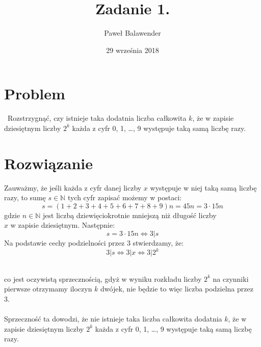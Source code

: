 \documentclass[11pt]{article}
\title{Zadanie 1.}
\date{29 września 2018}
\author{Paweł Balawender}
\begin{document}
\maketitle

\section*{Problem}\
Rozstrzygnąć, czy istnieje taka dodatnia liczba całkowita $k$, że w zapisie dziesiętnym liczby $2^k$ każda z cyfr 0, 1,  \ldots, 9 występuje taką samą liczbę razy.

\section*{Rozwiązanie}
Zauważmy, że jeśli każda z cyfr danej liczby $x$ występuje w niej taką samą liczbę razy, to sumę $s \in\mathbb{N}$ tych cyfr zapisać możemy w postaci:
\begin{equation}
s=(1+2+3+4+5+6+7+8+9)n = 45n = 3 \cdot 15n
\end{equation}
gdzie $n\in\mathbb{N}$ jest liczbą dziewięciokrotnie mniejszą niż długość liczby\\
$x$ w zapisie dziesiętnym. Następnie:
\begin{equation}
s = 3 \cdot 15n \iff 3|s
\end{equation}
Na podstawie cechy podzielności przez 3 stwierdzamy, że:
\begin{equation}
3|s \iff 3|x \iff 3|2^k
\end{equation}\

co jest oczywistą sprzecznością, gdyż w wyniku rozkładu liczby $2^k$ na czynniki pierwsze otrzymamy iloczyn $k$ dwójek, nie będzie to więc liczba podzielna przez 3.\\
\\
Sprzeczność ta dowodzi, że nie istnieje taka liczba całkowita dodatnia $k$, że w zapisie dziesiętnym liczby $2^k$ każda z cyfr 0, 1, \ldots, 9 występuje taką samą liczbę razy.
\end{document}

